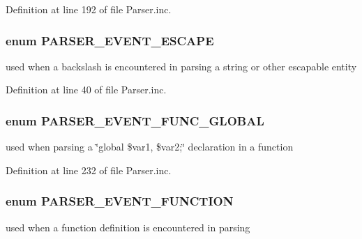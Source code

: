 \-Definition at line 192 of file \-Parser.\-inc.

\hypertarget{_parser_8inc_aebe69f3bef6c65c0edb5878c3f243ea9}{
\subsubsection[{\-P\-A\-R\-S\-E\-R\-\_\-\-E\-V\-E\-N\-T\-\_\-\-E\-S\-C\-A\-P\-E}]{\setlength{\rightskip}{0pt plus 5cm}enum {\bf \-P\-A\-R\-S\-E\-R\-\_\-\-E\-V\-E\-N\-T\-\_\-\-E\-S\-C\-A\-P\-E}}}\label{_parser_8inc_aebe69f3bef6c65c0edb5878c3f243ea9}
used when a backslash is encountered in parsing a string or other escapable entity 

\-Definition at line 40 of file \-Parser.\-inc.

\hypertarget{_parser_8inc_a92f447093cc5a08288a6c376cf0cc0a4}{
\subsubsection[{\-P\-A\-R\-S\-E\-R\-\_\-\-E\-V\-E\-N\-T\-\_\-\-F\-U\-N\-C\-\_\-\-G\-L\-O\-B\-A\-L}]{\setlength{\rightskip}{0pt plus 5cm}enum {\bf \-P\-A\-R\-S\-E\-R\-\_\-\-E\-V\-E\-N\-T\-\_\-\-F\-U\-N\-C\-\_\-\-G\-L\-O\-B\-A\-L}}}\label{_parser_8inc_a92f447093cc5a08288a6c376cf0cc0a4}
used when parsing a \char`\"{}global \$var1, \$var2;\char`\"{} declaration in a function 

\-Definition at line 232 of file \-Parser.\-inc.

\hypertarget{_parser_8inc_a5d50e7cf32d77f0e582e8df4a61e4576}{
\subsubsection[{\-P\-A\-R\-S\-E\-R\-\_\-\-E\-V\-E\-N\-T\-\_\-\-F\-U\-N\-C\-T\-I\-O\-N}]{\setlength{\rightskip}{0pt plus 5cm}enum {\bf \-P\-A\-R\-S\-E\-R\-\_\-\-E\-V\-E\-N\-T\-\_\-\-F\-U\-N\-C\-T\-I\-O\-N}}}\label{_parser_8inc_a5d50e7cf32d77f0e582e8df4a61e4576}
used when a function definition is encountered in parsing 


